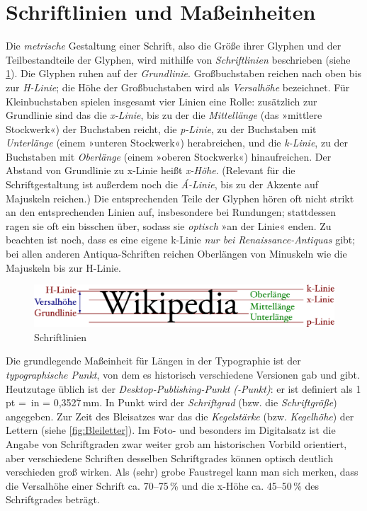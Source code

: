 \section{Schriftlinien und Maßeinheiten}
\label{sec:Linien}

Die \emph{metrische} Gestaltung einer Schrift, also die Größe ihrer
Glyphen und der Teilbestandteile der Glyphen, wird mithilfe von
\emph{Schriftlinien} beschrieben (siehe \cref{fig:Liniensystem}).  Die
Glyphen ruhen auf der \emph{Grundlinie}.  Großbuchstaben reichen nach
oben bis zur \emph{H-Linie}; die Höhe der Großbuchstaben wird als
\emph{Versalhöhe} bezeichnet.  Für Kleinbuchstaben spielen insgesamt
vier Linien eine Rolle: zusätzlich zur Grundlinie sind das die
\emph{x-Linie}, bis zu der die \emph{Mittellänge} (das »mittlere
Stockwerk«) der Buchstaben reicht, die \emph{p-Linie}, zu der
Buchstaben mit \emph{Unterlänge} (einem »unteren Stockwerk«)
herabreichen, und die \emph{k-Linie}, zu der Buchstaben mit
\emph{Oberlänge} (einem »oberen Stockwerk«) hinaufreichen.  Der
Abstand von Grundlinie zu x-Linie heißt \emph{x-Höhe}.  (Relevant für
die Schriftgestaltung ist außerdem noch die \emph{Á-Linie}, bis zu der
Akzente auf Majuskeln reichen.)  Die entsprechenden Teile der Glyphen
hören oft nicht strikt an den entsprechenden Linien auf, insbesondere
bei Rundungen; stattdessen ragen sie oft ein bisschen über, sodass sie
\emph{optisch} »an der Linie« enden.  Zu beachten ist noch, dass es
eine eigene k-Linie \emph{nur bei Renaissance-Antiquas} gibt; bei
allen anderen Antiqua-Schriften reichen Oberlängen von Minuskeln wie
die Majuskeln bis zur \mbox{H-Linie}.

\begin{figure}
  \centering
  \includegraphics[width=\textwidth]{Liniensystem}
  \caption{Schriftlinien\protect\footnotemark}
  \label{fig:Liniensystem}
\end{figure}

Die grundlegende Maßeinheit für Längen in der Typographie ist der
\emph{typographische Punkt}, von dem es historisch verschiedene
Versionen gab und gibt.  Heutzutage üblich ist der
\emph{Desktop-Publishing-Punkt} \emph{(-Punkt)}: er ist
definiert als 1\,pt = \,in =
0,352$\overline{\text{7}}$\,mm.  In Punkt wird der \emph{Schriftgrad}
(bzw. die \emph{Schriftgröße}) angegeben.  Zur Zeit des Bleisatzes war
das die \emph{Kegelstärke} (bzw. \emph{Kegelhöhe}) der Lettern (siehe
\cref{fig:Bleiletter}).  Im Foto- und besonders im Digitalsatz ist die
Angabe von Schriftgraden zwar weiter grob am historischen Vorbild
orientiert, aber verschiedene Schriften desselben Schriftgrades können
optisch deutlich verschieden groß wirken.  Als (sehr) grobe Faustregel
kann man sich merken, dass die Versalhöhe einer Schrift ca. 70--75\,\%
und die x-Höhe ca. 45--50\,\% des Schriftgrades beträgt.

